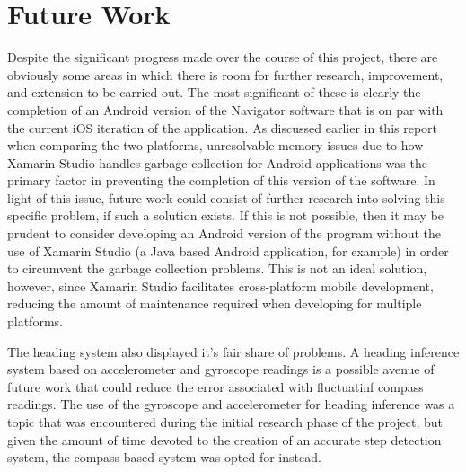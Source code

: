 \documentclass[main.tex]{subfiles}
\begin{document}
        \section{Future Work}
            Despite the significant progress made over the course of this project, there are obviously some areas in which there is room for
            further research, improvement, and extension to be carried out. The most significant of these is clearly the completion of an Android version of the
            Navigator software that is on par with the current iOS iteration of the application. As discussed earlier in this report when comparing
            the two platforms, unresolvable memory issues due to how Xamarin Studio handles garbage collection for Android applications was the
            primary factor in preventing the completion of this version of the software. In light of this issue, future work could consist of further research
            into solving this specific problem, if such a solution exists. If this is not possible, then it may be prudent to consider developing an Android version
            of the program without the use of Xamarin Studio (a Java based Android application, for example) in order to circumvent the garbage collection problems. This is
            not an ideal solution, however, since Xamarin Studio facilitates cross-platform mobile development, reducing the amount of maintenance required when developing
            for multiple platforms.
            
The heading system also displayed it's fair share of problems. A heading inference system based on accelerometer and gyroscope readings is a possible avenue of future work that could reduce the error associated with fluctuatinf compass readings. The use of the gyroscope and accelerometer for heading inference was a topic that was encountered during the initial research phase of the project, but given the amount of time devoted to the creation of an accurate step detection system, the compass based system was opted for instead.
            
\end{document}
